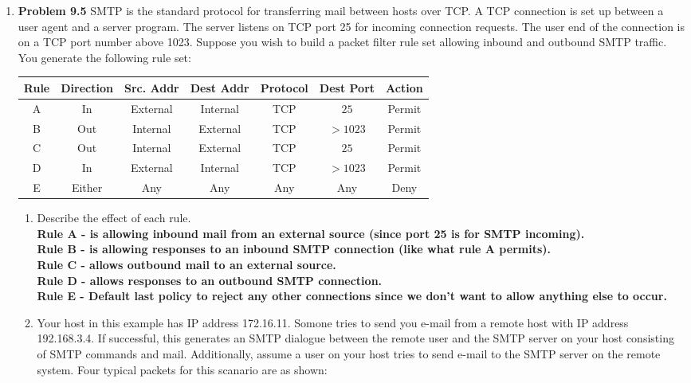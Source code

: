 \documentclass[12pt]{article}
\begin{document}
\begin{enumerate}
  \item \textbf{Problem 9.5} SMTP is the standard protocol for transferring mail between hosts over TCP. A TCP connection is set up between a user agent and a server program. The server listens on TCP port 25 for incoming connection requests. The user end of the connection is on a TCP port number above 1023. Suppose you wish to build a packet filter rule set allowing inbound and outbound SMTP traffic. You generate the following rule set: \\

\begin{center}
 \begin{tabular}{||c c c c c c c||}
 \hline
 Rule & Direction & Src. Addr & Dest Addr  & Protocol & Dest Port & Action \\ [0.5ex]
 \hline\hline
 A & In & External & Internal & TCP & $25$ & Permit \\
 \hline
 B & Out & Internal & External & TCP & $>1023$ & Permit \\
 \hline
 C & Out & Internal & External & TCP & $25$ & Permit \\
 \hline
 D & In & External & Internal & TCP & $>1023$ & Permit \\
 \hline
 E & Either & Any & Any & Any & Any & Deny \\ [1ex]
 \hline
\end{tabular}
\end{center}

\begin{enumerate}
  \item Describe the effect of each rule. \\
  \textbf{Rule A - is allowing inbound mail from an external source (since port 25 is for SMTP incoming).} \\
  \textbf{Rule B - is allowing responses to an inbound SMTP connection (like what rule A permits).} \\
  \textbf{Rule C - allows outbound mail to an external source.} \\
  \textbf{Rule D - allows responses to an outbound SMTP connection.} \\
  \textbf{Rule E - Default last policy to reject any other connections since we don't want to allow anything else to occur.} \\

  \item Your host in this example has IP address 172.16.11. Somone tries to send you e-mail from a remote host with IP address 192.168.3.4. If successful, this generates an SMTP dialogue between the remote user and the SMTP server on your host consisting of SMTP commands and mail. Additionally, assume a user on your host tries to send e-mail to the SMTP server on the remote system. Four typical packets for this scanario are as shown:


\end{enumerate}
\end{enumerate}
\end{document}
